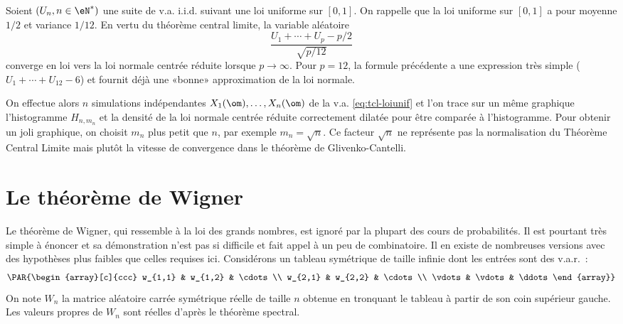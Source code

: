 Soient $(U_n,n\in\eN^*)$ une suite de v.a. i.i.d. suivant une loi uniforme sur
$[0,1]$.  On rappelle que la loi uniforme sur $[0,1]$ a pour moyenne $1/2$ et
variance $1/12$. En vertu du théorème central limite, la variable aléatoire
\begin{equation}\label{eq:tcl-loiunif}
\frac{U_1+\cdots+U_{p}-p/2}{\sqrt{p/12}}
\end{equation}
converge en loi vers la loi normale centrée réduite lorsque $p\to\infty$. Pour
$p=12$, la formule précédente a une expression très simple ($U_1+\cdots+U_{12}-6$)
et fournit déjà une «bonne» approximation de la loi normale. 

On effectue alors $n$ simulations indépendantes $X_1(\om),\ldots,X_n(\om)$ de la
v.a. \eqref{eq:tcl-loiunif} et l'on trace sur un même graphique l'histogramme
$H_{n,m_n}$ et la densité de la loi normale centrée réduite correctement
dilatée pour être comparée à l'histogramme. Pour obtenir un joli graphique, on
choisit $m_n$ plus petit que $n$, par exemple $m_n=\sqrt{n}$. Ce facteur
$\sqrt{n}$ ne représente pas la normalisation du Théorème Central Limite mais
plutôt la vitesse de convergence dans le théorème de Glivenko-Cantelli. 

%
%
%

%
\section{Le théorème de Wigner}
%

Le théorème de Wigner, qui ressemble à la loi des grands nombres, est ignoré
par la plupart des cours de probabilités. Il est pourtant très simple à
énoncer et sa démonstration n'est pas si difficile et fait appel à un peu de
combinatoire. Il en existe de nombreuses versions avec des hypothèses plus
faibles que celles requises ici.
Considérons un tableau symétrique de taille infinie dont les entrées sont des
v.a.r.~:
$$
\PAR{\begin{array}[c]{ccc}
 w_{1,1} & w_{1,2} & \cdots \\
 w_{2,1} & w_{2,2} & \cdots \\
 \vdots     & \vdots    & \ddots 
\end{array}}
$$
On note $W_n$ la matrice aléatoire carrée symétrique réelle de taille $n$
obtenue en tronquant le tableau à partir de son coin supérieur gauche. 
Les valeurs propres de $W_n$ sont réelles
d'après le théorème spectral.

